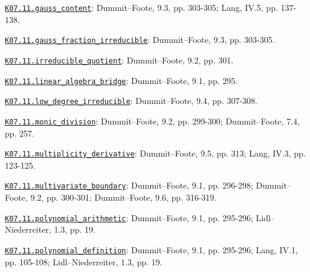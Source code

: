 \par\smallskip\noindent\hypertarget{src:K07.11.gauss_content}{}\label{src:K07.11.gauss_content}\hyperref[K07.11.gauss_content]{\texttt{K07.11.gauss\_content}}: Dummit--Foote, 9.3, pp. 303-305; Lang, IV.5, pp. 137-138.
\par\smallskip\noindent\hypertarget{src:K07.11.gauss_fraction_irreducible}{}\label{src:K07.11.gauss_fraction_irreducible}\hyperref[K07.11.gauss_fraction_irreducible]{\texttt{K07.11.gauss\_fraction\_irreducible}}: Dummit--Foote, 9.3, pp. 303-305.
\par\smallskip\noindent\hypertarget{src:K07.11.irreducible_quotient}{}\label{src:K07.11.irreducible_quotient}\hyperref[K07.11.irreducible_quotient]{\texttt{K07.11.irreducible\_quotient}}: Dummit--Foote, 9.2, pp. 301.
\par\smallskip\noindent\hypertarget{src:K07.11.linear_algebra_bridge}{}\label{src:K07.11.linear_algebra_bridge}\hyperref[K07.11.linear_algebra_bridge]{\texttt{K07.11.linear\_algebra\_bridge}}: Dummit--Foote, 9.1, pp. 295.
\par\smallskip\noindent\hypertarget{src:K07.11.low_degree_irreducible}{}\label{src:K07.11.low_degree_irreducible}\hyperref[K07.11.low_degree_irreducible]{\texttt{K07.11.low\_degree\_irreducible}}: Dummit--Foote, 9.4, pp. 307-308.
\par\smallskip\noindent\hypertarget{src:K07.11.monic_division}{}\label{src:K07.11.monic_division}\hyperref[K07.11.monic_division]{\texttt{K07.11.monic\_division}}: Dummit--Foote, 9.2, pp. 299-300; Dummit--Foote, 7.4, pp. 257.
\par\smallskip\noindent\hypertarget{src:K07.11.multiplicity_derivative}{}\label{src:K07.11.multiplicity_derivative}\hyperref[K07.11.multiplicity_derivative]{\texttt{K07.11.multiplicity\_derivative}}: Dummit--Foote, 9.5, pp. 313; Lang, IV.3, pp. 123-125.
\par\smallskip\noindent\hypertarget{src:K07.11.multivariate_boundary}{}\label{src:K07.11.multivariate_boundary}\hyperref[K07.11.multivariate_boundary]{\texttt{K07.11.multivariate\_boundary}}: Dummit--Foote, 9.1, pp. 296-298; Dummit--Foote, 9.2, pp. 300-301; Dummit--Foote, 9.6, pp. 316-319.
\par\smallskip\noindent\hypertarget{src:K07.11.polynomial_arithmetic}{}\label{src:K07.11.polynomial_arithmetic}\hyperref[K07.11.polynomial_arithmetic]{\texttt{K07.11.polynomial\_arithmetic}}: Dummit--Foote, 9.1, pp. 295-296; Lidl--Niederreiter, 1.3, pp. 19.
\par\smallskip\noindent\hypertarget{src:K07.11.polynomial_definition}{}\label{src:K07.11.polynomial_definition}\hyperref[K07.11.polynomial_definition]{\texttt{K07.11.polynomial\_definition}}: Dummit--Foote, 9.1, pp. 295-296; Lang, IV.1, pp. 105-108; Lidl--Niederreiter, 1.3, pp. 19.
